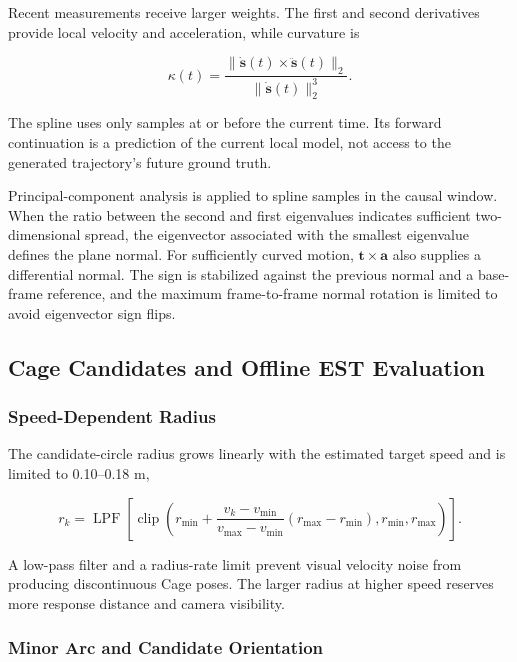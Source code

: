 \documentclass[conference]{IEEEtran}
\begin{document}
Recent measurements receive larger weights. The first and second derivatives provide local velocity and acceleration, while curvature is

\begin{equation}
\kappa(t)=\frac{\|\dot{\mathbf{s}}(t)\times\ddot{\mathbf{s}}(t)\|_2}
{\|\dot{\mathbf{s}}(t)\|_2^3}.

\end{equation}

The spline uses only samples at or before the current time. Its forward continuation is a prediction of the current local model, not access to the generated trajectory's future ground truth.

Principal-component analysis is applied to spline samples in the causal window. When the ratio between the second and first eigenvalues indicates sufficient two-dimensional spread, the eigenvector associated with the smallest eigenvalue defines the plane normal. For sufficiently curved motion, \(\mathbf{t}\times\mathbf{a}\) also supplies a differential normal. The sign is stabilized against the previous normal and a base-frame reference, and the maximum frame-to-frame normal rotation is limited to avoid eigenvector sign flips.

\subsection{Cage Candidates and Offline EST Evaluation}

\subsubsection{Speed-Dependent Radius}

The candidate-circle radius grows linearly with the estimated target speed and is limited to 0.10--0.18 m,

\begin{equation}
r_k=\operatorname{LPF}\!\left[
\operatorname{clip}\!\left(
r_{\min}+\frac{v_k-v_{\min}}{v_{\max}-v_{\min}}
(r_{\max}-r_{\min}),r_{\min},r_{\max}
\right)\right].

\end{equation}

A low-pass filter and a radius-rate limit prevent visual velocity noise from producing discontinuous Cage poses. The larger radius at higher speed reserves more response distance and camera visibility.

\subsubsection{Minor Arc and Candidate Orientation}
\end{document}
